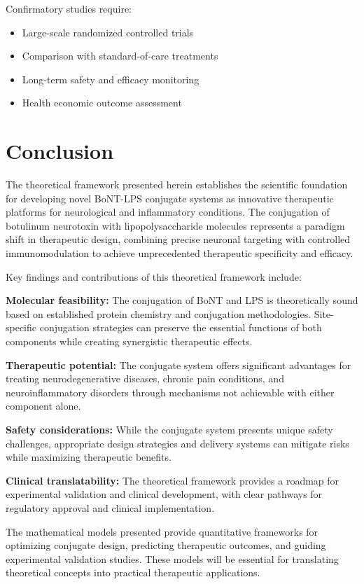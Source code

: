 \documentclass[11pt,a4paper]{article}
\begin{document}
Confirmatory studies require:
\begin{itemize}
\item Large-scale randomized controlled trials
\item Comparison with standard-of-care treatments
\item Long-term safety and efficacy monitoring
\item Health economic outcome assessment
\end{itemize}

\section{Conclusion}

The theoretical framework presented herein establishes the scientific foundation for developing novel BoNT-LPS conjugate systems as innovative therapeutic platforms for neurological and inflammatory conditions. The conjugation of botulinum neurotoxin with lipopolysaccharide molecules represents a paradigm shift in therapeutic design, combining precise neuronal targeting with controlled immunomodulation to achieve unprecedented therapeutic specificity and efficacy.

Key findings and contributions of this theoretical framework include:

\textbf{Molecular feasibility:} The conjugation of BoNT and LPS is theoretically sound based on established protein chemistry and conjugation methodologies. Site-specific conjugation strategies can preserve the essential functions of both components while creating synergistic therapeutic effects.

\textbf{Therapeutic potential:} The conjugate system offers significant advantages for treating neurodegenerative diseases, chronic pain conditions, and neuroinflammatory disorders through mechanisms not achievable with either component alone.

\textbf{Safety considerations:} While the conjugate system presents unique safety challenges, appropriate design strategies and delivery systems can mitigate risks while maximizing therapeutic benefits.

\textbf{Clinical translatability:} The theoretical framework provides a roadmap for experimental validation and clinical development, with clear pathways for regulatory approval and clinical implementation.

The mathematical models presented provide quantitative frameworks for optimizing conjugate design, predicting therapeutic outcomes, and guiding experimental validation studies. These models will be essential for translating theoretical concepts into practical therapeutic applications.
\end{document}
